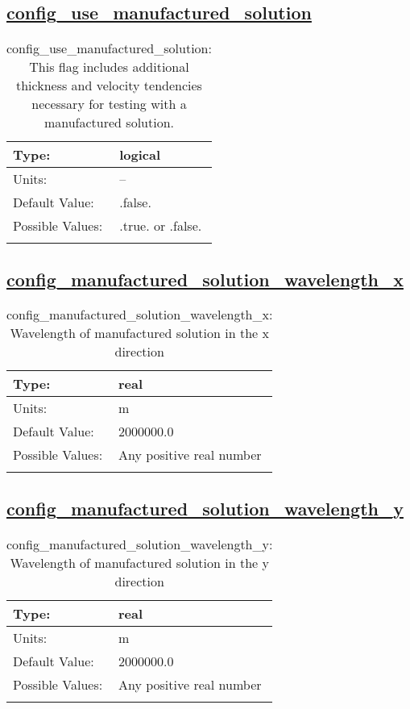 \subsection[config\_use\_manufactured\_solution]{\hyperref[sec:nm_tab_manufactured_solution]{config\_use\_manufactured\_solution}}
\label{subsec:nm_sec_config_use_manufactured_solution}
\begin{center}
\begin{longtable}{| p{2.0in} || p{4.0in} |}
    \hline
    Type: & logical \\
    \hline
    Units: & -- \\
    \hline
    Default Value: & .false. \\
    \hline
    Possible Values: & .true. or .false. \\
    \hline
    \caption{config\_use\_manufactured\_solution: This flag includes additional thickness and velocity tendencies necessary for testing with a manufactured solution.}
\end{longtable}
\end{center}
\subsection[config\_manufactured\_solution\_wavelength\_x]{\hyperref[sec:nm_tab_manufactured_solution]{config\_manufactured\_solution\_wavelength\_x}}
\label{subsec:nm_sec_config_manufactured_solution_wavelength_x}
\begin{center}
\begin{longtable}{| p{2.0in} || p{4.0in} |}
    \hline
    Type: & real \\
    \hline
    Units: & \si{m} \\
    \hline
    Default Value: & 2000000.0 \\
    \hline
    Possible Values: & Any positive real number \\
    \hline
    \caption{config\_manufactured\_solution\_wavelength\_x: Wavelength of manufactured solution in the x direction}
\end{longtable}
\end{center}
\subsection[config\_manufactured\_solution\_wavelength\_y]{\hyperref[sec:nm_tab_manufactured_solution]{config\_manufactured\_solution\_wavelength\_y}}
\label{subsec:nm_sec_config_manufactured_solution_wavelength_y}
\begin{center}
\begin{longtable}{| p{2.0in} || p{4.0in} |}
    \hline
    Type: & real \\
    \hline
    Units: & \si{m} \\
    \hline
    Default Value: & 2000000.0 \\
    \hline
    Possible Values: & Any positive real number \\
    \hline
    \caption{config\_manufactured\_solution\_wavelength\_y: Wavelength of manufactured solution in the y direction}
\end{longtable}
\end{center}

